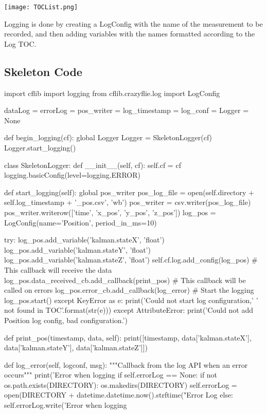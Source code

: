 \documentclass[]{article}
\begin{document}
\texttt{[image: TOCList.png]}

Logging is done by creating a LogConfig with the name of the measurement to be recorded, and then adding variables with the names formatted according to the Log TOC.

\subsection{Skeleton Code}

\begin{Python}
import cflib
import logging
from cflib.crazyflie.log import LogConfig

dataLog = errorLog = pos_writer = log_timestamp = log_conf = Logger = None

def begin_logging(cf):
	global Logger	
	Logger = SkeletonLogger(cf)
	Logger.start_logging()

class SkeletonLogger:
	def __init__(self, cf):	
		self.cf = cf
		logging.basicConfig(level=logging.ERROR)

	def start_logging(self):
		global pos_writer
		pos_log_file = open(self.directory + self.log_timestamp 
			+ '_pos.csv', 'wb')
		pos_writer = csv.writer(pos_log_file)
		pos_writer.writerow(['time', 'x_pos', 'y_pos', 'z_pos'])
		log_pos = LogConfig(name='Position', period_in_ms=10)
		
		try:
			log_pos.add_variable('kalman.stateX', 'float')
			log_pos.add_variable('kalman.stateY', 'float')
			log_pos.add_variable('kalman.stateZ', 'float')
			self.cf.log.add_config(log_pos)
			# This callback will receive the data
			log_pos.data_received_cb.add_callback(print_pos)
			# This callback will be called on errors
			log_pos.error_cb.add_callback(log_error)
			# Start the logging
			log_pos.start()
		except KeyError as e:
			print('Could not start log configuration,'
				'{} not found in TOC'.format(str(e)))
		except AttributeError:
			print('Could not add Position log config, bad configuration.')
		
	def print_pos(timestamp, data, self):
		print([timestamp, data['kalman.stateX'], data['kalman.stateY'],
			data['kalman.stateZ']])
	
	def log_error(self, logconf, msg):
		"""Callback from the log API when an error occurs"""
		print('Error when logging %
		if self.errorLog == None:
			if not os.path.exists(DIRECTORY):
				os.makedirs(DIRECTORY)
			self.errorLog = open(DIRECTORY + datetime.datetime.now().strftime("Error Log %
		else:
			self.errorLog.write('Error when logging %
\end{Python}
\end{document}
